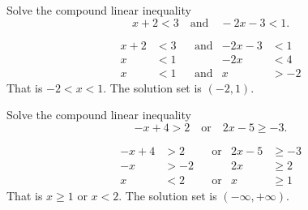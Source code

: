 	\begin{multicols}{2}
		\begin{example}
			Solve the compound linear inequality 
			\[
			x+2<3\quad \text{and}\quad -2x-3<1.
			\]
		\end{example}
		\begin{solution}
				\begin{align*}
					x+2 & <3 &  & \text{and} & -2x-3 & <1  \\
					x   & <1 &  &            & -2x   & <4  \\
					x   & <1 &  & \text{and} & x     & >-2
				\end{align*}
			That is $-2<x<1$. The solution set is $(-2, 1)$.
		\end{solution}


		\columnbreak


		\begin{example}
			Solve the compound linear inequality  
			\[
			-x+4>2 \quad \text{or} \quad 2x-5\geq -3.
			\]
		\end{example}
		\begin{solution}
				\begin{align*}
					-x+4 & >2  &  & \text{or} & 2x-5 & \geq -3 \\
					-x   & >-2 &  &           & 2x   & \geq 2  \\
					x    & <2  &  & \text{or} & x    & \geq 1
				\end{align*}
			That is $x\geq 1$ or $x< 2$. The solution set is $(-\infty, +\infty)$.
		\end{solution}
	\end{multicols}



